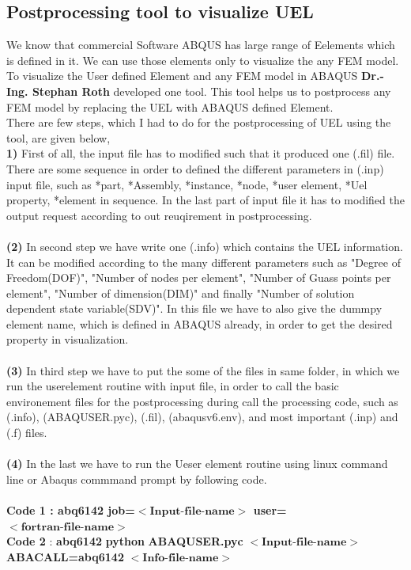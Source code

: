 \documentclass[12pt]{article}
\begin{document}
\begin{appendices}
\section{Postprocessing tool to visualize UEL}
We know that commercial Software ABQUS has large range of Eelements which is defined in it. We can use those elements only to visualize the any FEM model. To visualize the User defined Element and any FEM model in ABAQUS \textbf{Dr.-Ing. Stephan Roth} developed one tool. This tool helps us to postprocess any FEM model by replacing the UEL with ABAQUS defined Element.
\\
\newline
There are few steps, which I had to do for the postprocessing of UEL using the tool, are given below,
\newline
\\
\textbf{1)} First of all, the input file has to modified such that it produced one (.fil) file. There are some sequence in order to defined the different parameters in (.inp) input file, such as *part, *Assembly, *instance, *node, *user element, *Uel property, *element in sequence.
In the last part of input file it has to modified the output request according to out reuqirement in postprocessing.
\\
\\
\textbf{(2)} In second step we have write one (.info) which contains the UEL information. It can be modified according to the many different parameters such as "Degree of Freedom(DOF)", "Number of nodes per element", "Number of Guass points per element", "Number of dimension(DIM)" and finally "Number of solution dependent state variable(SDV)". In this file we have to also give the dummpy element name, which is defined in ABAQUS already, in order to get the desired property in visualization. 
\\
\\
\textbf{(3)} In third step we have to put the some of the files in same folder, in which we run the userelement routine with input file, in order to call the basic environement files for the postprocessing during call the processing code, such as (.info), (ABAQUSER.pyc), (.fil), (abaqusv6.env), and most important (.inp) and (.f) files.
\\
\\
\textbf{(4)} In the last we have to run the Ueser element routine using linux command line or Abaqus commmand prompt by following code.
\\
\\
\textbf{Code 1 : abq6142 job=$<\textbf{Input-file-name}>$ user=$<\textbf{fortran-file-name}>$}
\\
\textbf{Code 2} : \textbf{abq6142} \textbf{python} \textbf{ABAQUSER.pyc} $<\textbf{Input-file-name}>$ \\
\textbf{ABACALL=abq6142} $<\textbf{Info-file-name}>$


\end{appendices}
\end{document}
